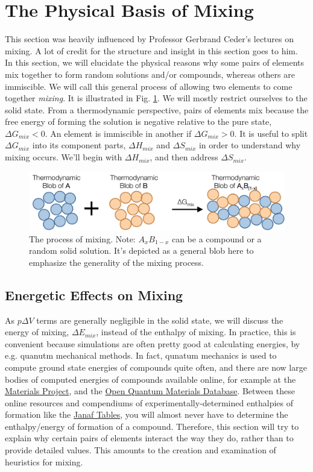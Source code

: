 \documentclass[12pt]{article}
\begin{document}
\section{The Physical Basis of Mixing}
This section was heavily influenced by Professor Gerbrand Ceder's lectures on mixing. A lot of credit for the structure and insight in this section goes to him.\\
In this section, we will elucidate the physical reasons why some pairs of elements mix together to form random solutions and/or compounds, whereas others are immiscible. We will call this general process of allowing two elements to come together \emph{mixing}. It is illustrated in Fig. \ref{mixing_process}. We will mostly restrict ourselves to the solid state. From a thermodynamic perspective, pairs of elements mix because the free energy of forming the solution is negative relative to the pure state, $\Delta G_{mix} <0$. An element is immiscible in another if $\Delta G_{mix} >0$. It is useful to split $\Delta G_{mix}$ into its component parts, $\Delta H_{mix}$ and $\Delta S_{mix}$ in order to understand why mixing occurs. We'll begin with $\Delta H_{mix}$, and then address $\Delta S_{mix}$.  

\begin{figure}[h]
\centering
\includegraphics[width=\textwidth]{process_of_mixing}
\caption{The process of mixing. Note: $A_x B_{1-x}$ can be a compound or a random solid solution. It's depicted as a general blob here to emphasize the generality of the mixing process.}
\label{mixing_process}
\end{figure}

\subsection{Energetic Effects on Mixing}
As $p \Delta V$ terms are generally negligible in the solid state, we will discuss the energy of mixing, $\Delta E_{mix}$, instead of the enthalpy of mixing. In practice, this is convenient because simulations are often pretty good at calculating energies, by e.g. quanutm mechanical methods. In fact, qunatum mechanics is used to compute ground state energies of compounds quite often, and there are now large bodies of computed energies of compounds available online, for example at the \href{https://www.materialsproject.org/}{Materials Project}, and the \href{http://oqmd.org/}{Open Quantum Materials Database}. Between these online resources and compendiums of experimentally-determined enthalpies of formation like the \href{http://kinetics.nist.gov/janaf/}{Janaf Tables}, you will almost never have to determine the enthalpy/energy of formation of a compound. Therefore, this section will try to explain why certain pairs of elements interact the way they do, rather than to provide detailed values. This amounts to the creation and examination of heuristics for mixing.
\end{document}
